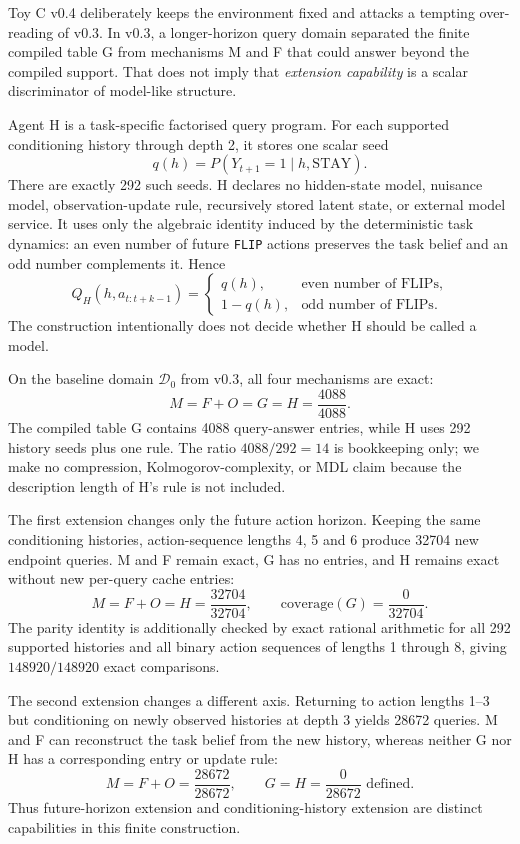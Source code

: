 \documentclass[10pt]{article}
\begin{document}
Toy C v0.4 deliberately keeps the environment fixed and attacks a tempting over-reading of v0.3. In v0.3, a longer-horizon query domain separated the finite compiled table G from mechanisms M and F that could answer beyond the compiled support. That does not imply that \emph{extension capability} is a scalar discriminator of model-like structure.

Agent H is a task-specific factorised query program. For each supported conditioning history through depth 2, it stores one scalar seed
\[
q(h)=P(Y_{t+1}=1\mid h,\mathrm{STAY}).
\]
There are exactly 292 such seeds. H declares no hidden-state model, nuisance model, observation-update rule, recursively stored latent state, or external model service. It uses only the algebraic identity induced by the deterministic task dynamics: an even number of future \texttt{FLIP} actions preserves the task belief and an odd number complements it. Hence
\[
Q_H(h,a_{t:t+k-1})=
\begin{cases}
q(h), & \text{even number of FLIPs},\\
1-q(h), & \text{odd number of FLIPs}.
\end{cases}
\]
The construction intentionally does not decide whether H should be called a model.

On the baseline domain $\mathcal D_0$ from v0.3, all four mechanisms are exact:
\[
M=F+O=G=H=\frac{4088}{4088}.
\]
The compiled table G contains 4088 query-answer entries, while H uses 292 history seeds plus one rule. The ratio $4088/292=14$ is bookkeeping only; we make no compression, Kolmogorov-complexity, or MDL claim because the description length of H's rule is not included.

The first extension changes only the future action horizon. Keeping the same conditioning histories, action-sequence lengths 4, 5 and 6 produce 32704 new endpoint queries. M and F remain exact, G has no entries, and H remains exact without new per-query cache entries:
\[
M=F+O=H=\frac{32704}{32704},
\qquad
\mathrm{coverage}(G)=\frac{0}{32704}.
\]
The parity identity is additionally checked by exact rational arithmetic for all 292 supported histories and all binary action sequences of lengths 1 through 8, giving $148920/148920$ exact comparisons.

The second extension changes a different axis. Returning to action lengths 1--3 but conditioning on newly observed histories at depth 3 yields 28672 queries. M and F can reconstruct the task belief from the new history, whereas neither G nor H has a corresponding entry or update rule:
\[
M=F+O=\frac{28672}{28672},
\qquad
G=H=\frac{0}{28672}\text{ defined}.
\]
Thus future-horizon extension and conditioning-history extension are distinct capabilities in this finite construction.
\end{document}
